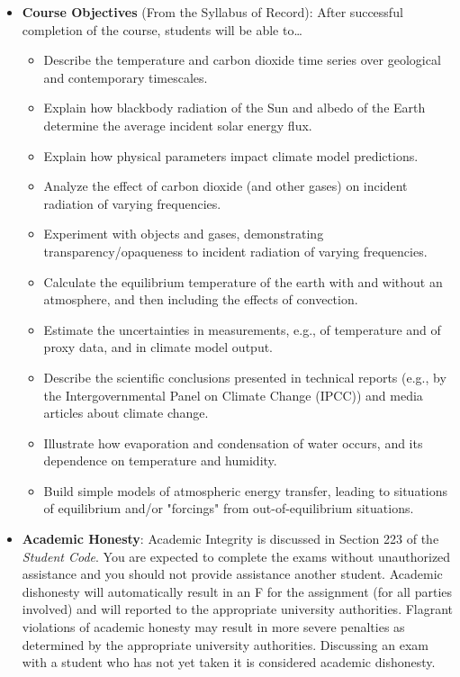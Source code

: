 \documentclass{article}
\begin{document}
\begin{itemize}
\item[] {\bf Course Objectives} (From the Syllabus of Record): After successful completion of the course, students will be able to\ldots
	\begin{itemize}
	\item Describe the temperature and carbon dioxide time series over geological and contemporary timescales. 
	\item Explain how blackbody radiation of the Sun and albedo of the Earth determine the average incident solar energy flux. 
	\item Explain how physical parameters impact climate model predictions. 
	\item Analyze the effect of carbon dioxide (and other gases) on incident radiation of varying frequencies. 
	\item Experiment with objects and gases, demonstrating transparency/opaqueness to incident radiation of varying frequencies. 
	\item Calculate the equilibrium temperature of the earth with and without an atmosphere, and then including the effects of convection. 
	\item Estimate the uncertainties in measurements, e.g., of temperature and of proxy data, and in climate model output. 
	\item Describe the scientific conclusions presented in technical reports (e.g., by the Intergovernmental Panel on Climate Change (IPCC)) and media articles about climate change.
	\item Illustrate how evaporation and condensation of water occurs, and its dependence on temperature and humidity. 
	\item Build simple models of atmospheric energy transfer, leading to situations of equilibrium and/or "forcings" from out-of-equilibrium situations.
	\end{itemize}


\item[] {\bf Academic Honesty}: Academic Integrity is discussed in Section 223 of the {\em Student Code}. You are expected to complete the exams without unauthorized assistance and you should not provide assistance another student. Academic dishonesty will automatically result in an F for the assignment (for all parties involved) and will reported to the appropriate university authorities.  Flagrant violations of academic honesty may result in more severe penalties as determined by the appropriate university authorities.  Discussing an exam with a student who has not yet taken it is considered academic dishonesty.


\end{itemize}
\end{document}
